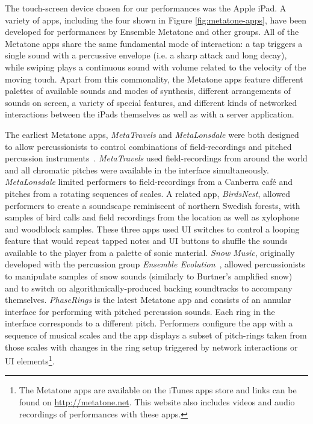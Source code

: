 \documentclass[graybox]{svmult}
\begin{document}
The touch-screen device chosen for our performances was the Apple
iPad. A variety of apps, including the four shown in Figure
\ref{fig:metatone-apps}, have been developed for performances
by Ensemble Metatone and other groups. All of the Metatone apps
share the same fundamental mode of interaction: a tap triggers a
single sound with a percussive envelope (i.e. a sharp attack and long
decay), while swiping plays a continuous sound with volume related to
the velocity of the moving touch. Apart from this commonality, the
Metatone apps feature different palettes of available sounds and modes
of synthesis, different arrangements of sounds on screen, a variety of
special features, and different kinds of networked interactions
between the iPads themselves as well as with a server application.

The earliest Metatone apps, \emph{MetaTravels} and \emph{MetaLonsdale}
were both designed to allow percussionists to control combinations of
field-recordings and pitched percussion
instruments~\cite{Martin:2014xp}. \emph{MetaTravels} used
field-recordings from around the world and all chromatic pitches were
available in the interface simultaneously. \emph{MetaLonsdale} limited
performers to field-recordings from a Canberra caf\'e and pitches from
a rotating sequences of scales. A related app, \emph{BirdsNest},
allowed performers to create a soundscape reminiscent of northern
Swedish forests, with samples of bird calls and field recordings from
the location as well as xylophone and woodblock samples. These three
apps used UI switches to control a looping feature that would repeat
tapped notes and UI buttons to shuffle the sounds available to the
player from a palette of sonic material. \emph{Snow Music}, originally developed with the
percussion group \emph{Ensemble Evolution}~\cite{Martin:2012fk},
 allowed
percussionists to manipulate samples of snow sounds (similarly to
Burtner's amplified snow) and to switch on algorithmically-produced backing
soundtracks to accompany themselves. 
\emph{PhaseRings} is the latest
Metatone app and consists of an annular interface for performing with
pitched percussion sounds. Each ring in the interface corresponds to a
different pitch. Performers configure the app with a sequence of
musical scales and the app displays a subset of pitch-rings taken from
those scales with changes in the ring setup triggered by network
interactions or UI elements\footnote{The Metatone apps are available
  on the iTunes apps store and links can be found on
  \url{http://metatone.net}. This website also includes videos and
  audio recordings of performances with these apps.}.
\end{document}

